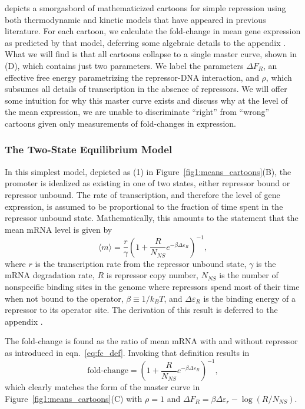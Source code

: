  depicts a smorgasbord of mathematicized cartoons for
simple repression using both thermodynamic and kinetic models that have
appeared in previous literature. For each cartoon, we calculate the fold-change
in mean gene expression as predicted by that model, deferring some algebraic
details to the appendix . What we will find
is that all cartoons collapse to a single master curve, shown in
(D), which contains just two parameters. We label the
parameters $\Delta F_R$, an effective free energy parametrizing the
repressor-DNA interaction, and $\rho$, which subsumes all details of
transcription in the absence of repressors. We will offer some intuition for why
this master curve exists and discuss why at the level of the mean expression, we
are unable to discriminate ``right'' from ``wrong'' cartoons given only
measurements of fold-changes in expression.

\subsubsection{The Two-State Equilibrium Model}
In this simplest model, depicted as (1) in Figure~\ref{fig1:means_cartoons}(B),
the promoter is idealized as existing in one of two states, either repressor
bound or repressor unbound. The rate of transcription, and therefore the level
of gene expression, is assumed to be proportional to the fraction of time spent
in the repressor unbound state. Mathematically, this amounts to the statement
that the mean mRNA level is given by
\begin{equation}
\langle m \rangle = \frac{r}{\gamma}
        \left(1 + \frac{R}{N_{NS}} e^{-\beta\Delta\varepsilon_R}\right)^{-1},
\end{equation}
where $r$ is the transcription rate from the repressor unbound state, $\gamma$
is the mRNA degradation rate, $R$ is repressor copy number, $N_{NS}$ is the
number of nonspecific binding sites in the genome where repressors spend most
of their time when not bound to the operator, $\beta \equiv 1/k_BT$, and
$\Delta\varepsilon_R$ is the binding energy of a repressor to its operator site.
The derivation of this result is deferred to the appendix .

The fold-change is  found as the ratio of mean mRNA with and without repressor
as introduced in eqn.~\ref{eq:fc_def}. Invoking that definition results in
\begin{equation}
\text{fold-change}
= \left(1 + \frac{R}{N_{NS}} e^{-\beta\Delta\varepsilon_R}\right)^{-1},
\end{equation}
which clearly matches the form of the master curve in
Figure~\ref{fig1:means_cartoons}(C) with $\rho=1$ and $\Delta F_R = 
\beta\Delta\varepsilon_r - \log (R / N_{NS})$.

